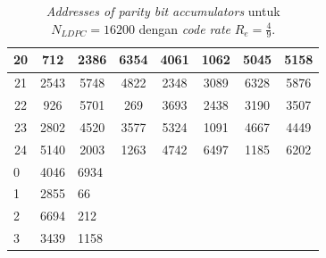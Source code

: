 \begin{table}[tb]
\centering
\caption{\textit{Addresses of parity bit accumulators} untuk $N_{LDPC}=16200$ dengan \textit{code rate} $R_e=\frac{4}{9}$.}
\label{table:adressldpc}
		\begin{tabular}{|l|l|l|lllll}
			\hline
			\multicolumn{1}{|c|}{20} & \multicolumn{1}{c|}{712}  & \multicolumn{1}{c|}{2386} & \multicolumn{1}{c|}{6354} & \multicolumn{1}{c|}{4061} & \multicolumn{1}{c|}{1062} & \multicolumn{1}{c|}{5045} & \multicolumn{1}{c|}{5158} \\ \hline
			\multicolumn{1}{|c|}{21} & \multicolumn{1}{c|}{2543} & \multicolumn{1}{c|}{5748} & \multicolumn{1}{c|}{4822} & \multicolumn{1}{c|}{2348} & \multicolumn{1}{c|}{3089} & \multicolumn{1}{c|}{6328} & \multicolumn{1}{c|}{5876} \\ \hline
			\multicolumn{1}{|c|}{22} & \multicolumn{1}{c|}{926}  & \multicolumn{1}{c|}{5701} & \multicolumn{1}{c|}{269}  & \multicolumn{1}{c|}{3693} & \multicolumn{1}{c|}{2438} & \multicolumn{1}{c|}{3190} & \multicolumn{1}{c|}{3507} \\ \hline
			\multicolumn{1}{|c|}{23} & \multicolumn{1}{c|}{2802} & \multicolumn{1}{c|}{4520} & \multicolumn{1}{c|}{3577} & \multicolumn{1}{c|}{5324} & \multicolumn{1}{c|}{1091} & \multicolumn{1}{c|}{4667} & \multicolumn{1}{c|}{4449} \\ \hline
			\multicolumn{1}{|c|}{24} & \multicolumn{1}{c|}{5140} & \multicolumn{1}{c|}{2003} & \multicolumn{1}{c|}{1263} & \multicolumn{1}{c|}{4742} & \multicolumn{1}{c|}{6497} & \multicolumn{1}{c|}{1185} & \multicolumn{1}{c|}{6202} \\ \hline
			0                        & 4046                      & 6934                      &                           &                           &                           &                           &                           \\ \cline{1-3}
			1                        & 2855                      & 66                        &                           &                           &                           &                           &                           \\ \cline{1-3}
			2                        & 6694                      & 212                       &                           &                           &                           &                           &                           \\ \cline{1-3}
			3                        & 3439                      & 1158                      &                           &                           &                           &                           &                           \\ \cline{1-3}

\end{tabular}
\end{table}

